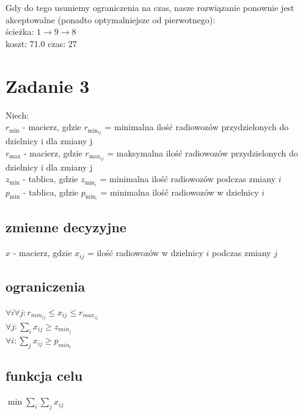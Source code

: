 \documentclass{report}
\begin{document}
Gdy do tego usuniemy ograniczenia na czas, nasze rozwiązanie
ponownie jest akceptowalne (ponadto optymalniejsze od pierwotnego):\\
ścieżka: $1 \rightarrow 9 \rightarrow 8$\\
koszt: 71.0
czas: 27


\section*{Zadanie 3}
Niech:\\
$r_{\text{min}}$ - macierz, gdzie
$r_{\text{min}_{ij}}$ = minimalna ilość radiowozów przydzielonych do dzielnicy i dla zmiany j\\
$r_{\text{max}}$ - macierz, gdzie
$r_{\text{max}_{ij}}$ = maksymalna ilość radiowozów przydzielonych do dzielnicy i dla zmiany j\\
$z_{\text{min}}$ - tablica, gdzie
$z_{\text{min}_{i}}$ = minimalna ilość radiowozów podczas zmiany $i$\\
$p_{\text{min}}$ - tablica, gdzie
$p_{\text{min}_{i}}$ = minimalna ilość radiowozów w dzielnicy $i$\\
\subsection*{zmienne decyzyjne}
\(x\) - macierz, gdzie
\(x_{ij}\) = ilość radiowozów w dzielnicy $i$ podczas zmiany $j$
\subsection*{ograniczenia}
$\forall i \forall j : r_{min_{ij}} \le x_{ij} \le r_{max_{ij}}$\\
$\forall j : \sum_{i} x_{ij} \ge z_{min_j}$\\
$\forall i : \sum_{j} x_{ij} \ge p_{min_i}$\\
\subsection*{funkcja celu}
$\min \sum_{i} \sum_{j} x_{ij}$
\end{document}
